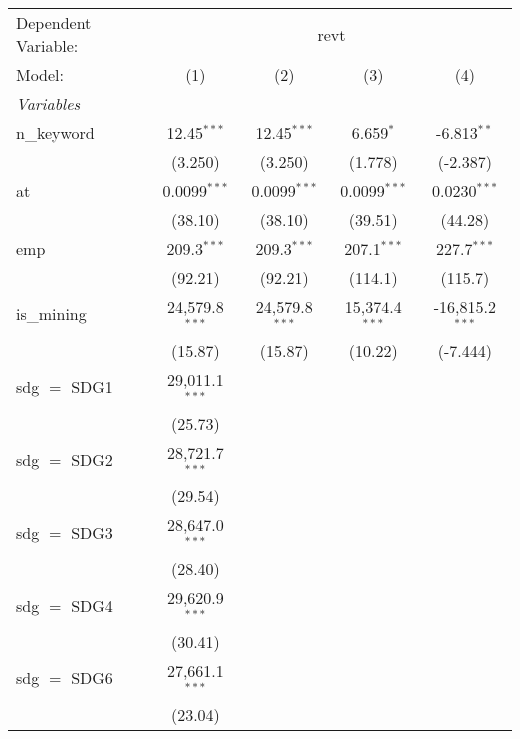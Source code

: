 
\begingroup
\centering
\begin{tabular}{lcccc}
   \tabularnewline \midrule \midrule
   Dependent Variable: & \multicolumn{4}{c}{revt}\\
   Model:        & (1)              & (2)              & (3)              & (4)\\  
   \midrule
   \emph{Variables}\\
   n\_keyword    & 12.45$^{***}$    & 12.45$^{***}$    & 6.659$^{*}$      & -6.813$^{**}$\\   
                 & (3.250)          & (3.250)          & (1.778)          & (-2.387)\\   
   at            & 0.0099$^{***}$   & 0.0099$^{***}$   & 0.0099$^{***}$   & 0.0230$^{***}$\\   
                 & (38.10)          & (38.10)          & (39.51)          & (44.28)\\   
   emp           & 209.3$^{***}$    & 209.3$^{***}$    & 207.1$^{***}$    & 227.7$^{***}$\\   
                 & (92.21)          & (92.21)          & (114.1)          & (115.7)\\   
   is\_mining    & 24,579.8$^{***}$ & 24,579.8$^{***}$ & 15,374.4$^{***}$ & -16,815.2$^{***}$\\   
                 & (15.87)          & (15.87)          & (10.22)          & (-7.444)\\   
   sdg $=$ SDG1  & 29,011.1$^{***}$ &                  &                  &   \\   
                 & (25.73)          &                  &                  &   \\   
   sdg $=$ SDG2  & 28,721.7$^{***}$ &                  &                  &   \\   
                 & (29.54)          &                  &                  &   \\   
   sdg $=$ SDG3  & 28,647.0$^{***}$ &                  &                  &   \\   
                 & (28.40)          &                  &                  &   \\   
   sdg $=$ SDG4  & 29,620.9$^{***}$ &                  &                  &   \\   
                 & (30.41)          &                  &                  &   \\   
   sdg $=$ SDG6  & 27,661.1$^{***}$ &                  &                  &   \\   
                 & (23.04)          &                  &                  &   \\   

\end{tabular}
